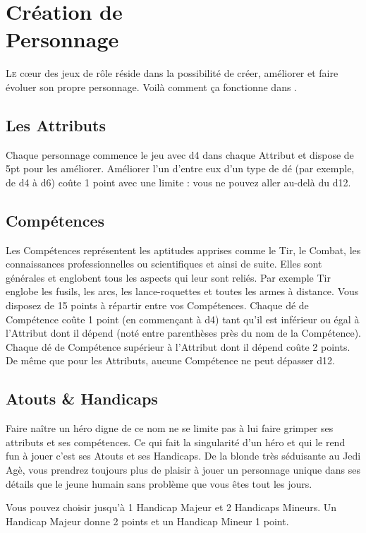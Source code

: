
\section{Création de \\ Personnage}
\lettrine{L}{e} c\oe{}ur des jeux de rôle réside dans la possibilité de créer, améliorer et faire évoluer son propre personnage. Voilà comment ça fonctionne dans {\jedifont \doctitle}. 

\subsection{Les Attributs}
Chaque personnage commence le jeu avec d4 dans chaque Attribut et dispose de 5pt pour les améliorer. Améliorer l'un d'entre eux d’un type de dé (par exemple, de d4 à d6) coûte 1 point avec une limite : vous ne pouvez aller au-delà du d12.

\subsection{Compétences}
Les Compétences représentent les aptitudes apprises comme le Tir, le Combat, les connaissances professionnelles ou scientifiques et ainsi de suite. Elles sont générales et englobent tous les aspects qui leur sont reliés. Par exemple Tir englobe les fusils, les arcs, les lance-roquettes et toutes les armes à distance. Vous disposez de 15 points à répartir entre vos Compétences. Chaque dé de Compétence coûte 1 point (en commençant à d4) tant qu’il est inférieur ou égal à l’Attribut dont il dépend (noté entre parenthèses près du nom de la Compétence). Chaque dé de Compétence supérieur à l’Attribut dont il dépend coûte 2 points. De même que pour les Attributs, aucune Compétence ne peut dépasser d12.

\subsection{Atouts & Handicaps}
Faire naître un héro digne de ce nom ne se limite pas à lui faire grimper ses attributs et ses compétences. Ce qui fait la singularité d'un héro et qui le rend fun à jouer c'est ses Atouts et ses Handicaps. De la blonde très séduisante au Jedi Agè, vous prendrez toujours plus de plaisir à jouer un personnage unique dans ses détails que le jeune humain sans problème que vous êtes tout les jours.

Vous pouvez choisir jusqu’à 1 Handicap Majeur et 2 Handicaps Mineurs. Un Handicap Majeur donne 2 points et un Handicap Mineur 1 point.


